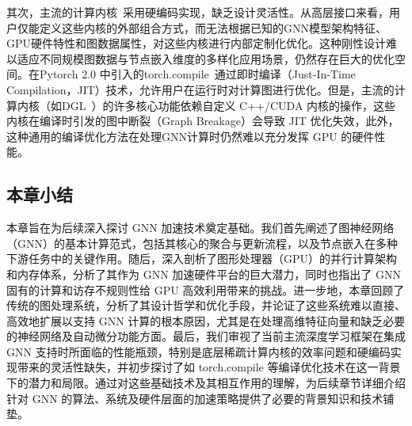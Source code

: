 其次，主流的计算内核~\cite{pyG, wang2019dgl}采用硬编码实现，缺乏设计灵活性。从高层接口来看，用户仅能定义这些内核的外部组合方式，而无法根据已知的GNN模型架构特征、GPU硬件特性和图数据属性，对这些内核进行内部定制化优化。这种刚性设计难以适应不同规模图数据与节点嵌入维度的多样化应用场景，仍然存在巨大的优化空间。在Pytorch 2.0 中引入的torch.compile~\cite{torchCompile}通过即时编译（Just-In-Time Compilation，JIT）技术，允许用户在运行时对计算图进行优化。但是，主流的计算内核（如DGL~\cite{wang2019dgl}）的许多核心功能依赖自定义 C++/CUDA 内核的操作，这些内核在编译时引发的图中断裂（Graph Breakage）会导致 JIT 优化失效，此外，这种通用的编译优化方法在处理GNN计算时仍然难以充分发挥 GPU 的硬件性能。

\subsection{本章小结}
本章旨在为后续深入探讨 GNN 加速技术奠定基础。我们首先阐述了图神经网络（GNN）的基本计算范式，包括其核心的聚合与更新流程，以及节点嵌入在多种下游任务中的关键作用。随后，深入剖析了图形处理器（GPU）的并行计算架构和内存体系，分析了其作为 GNN 加速硬件平台的巨大潜力，同时也指出了 GNN 固有的计算和访存不规则性给 GPU 高效利用带来的挑战。进一步地，本章回顾了传统的图处理系统，分析了其设计哲学和优化手段，并论证了这些系统难以直接、高效地扩展以支持 GNN 计算的根本原因，尤其是在处理高维特征向量和缺乏必要的神经网络及自动微分功能方面。最后，我们审视了当前主流深度学习框架在集成 GNN 支持时所面临的性能瓶颈，特别是底层稀疏计算内核的效率问题和硬编码实现带来的灵活性缺失，并初步探讨了如 torch.compile 等编译优化技术在这一背景下的潜力和局限。通过对这些基础技术及其相互作用的理解，为后续章节详细介绍针对 GNN 的算法、系统及硬件层面的加速策略提供了必要的背景知识和技术铺垫。



